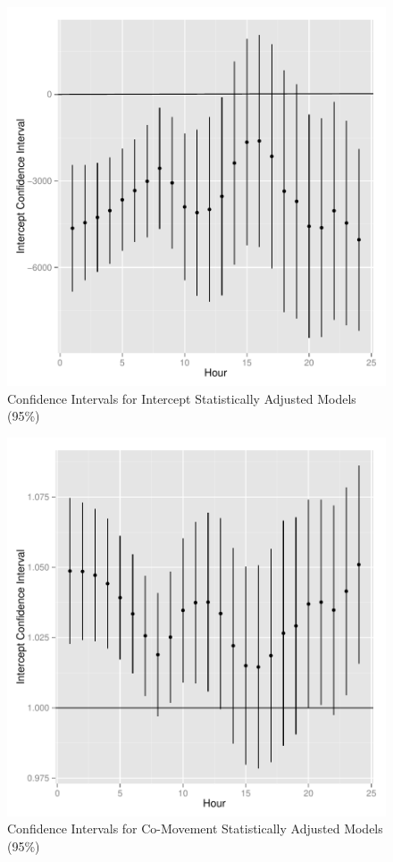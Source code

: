 \documentclass{article}
\begin{document}
\begin{figure}
\begin{center}
\caption{Confidence Intervals for Intercept Statistically Adjusted Models (95\%)}
\includegraphics{DraftPaper-003}
\end{center}
\end{figure}



\begin{figure}
\begin{center}
\caption{Confidence Intervals for Co-Movement Statistically Adjusted Models (95\%)}
\includegraphics{DraftPaper-004}
\end{center}
\end{figure}
\end{document}

